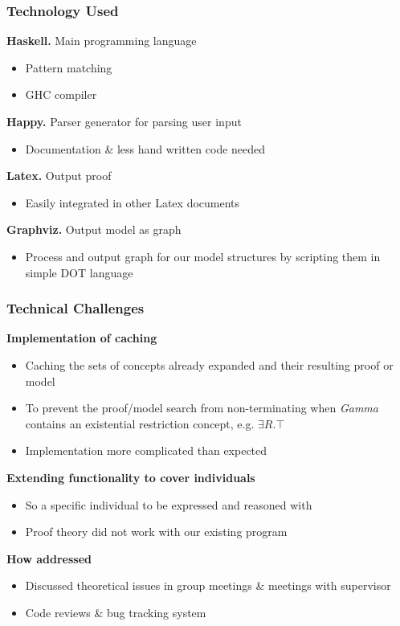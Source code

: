 \begin{frame}
  \frametitle{Technology Used}
\textbf{Haskell.} Main programming language
\begin{itemize}
\item Pattern matching
\item GHC compiler
\end{itemize}
\smallskip
\textbf{Happy.} Parser generator for parsing user input
\begin{itemize}
\item Documentation \& less hand written code needed
\end{itemize}
\smallskip
\textbf{Latex.} Output proof
\begin{itemize}
\item Easily integrated in other Latex documents
\end{itemize}
\smallskip
\textbf{Graphviz.} Output model as graph
\begin{itemize}
\item Process and output graph for our model structures by scripting them in simple DOT language
\end{itemize}
 \end{frame}

\begin{frame}
  \frametitle{Technical Challenges}
\textbf{Implementation of caching}
\begin{itemize}
\item Caching the sets of concepts already expanded and their resulting proof or model
\item To prevent the proof/model search from non-terminating when \textit{Gamma} contains an existential restriction concept, e.g. $\exists R . \top$
\item Implementation more complicated than expected
\end{itemize}

\textbf{Extending functionality to cover individuals}
\begin{itemize}
\item So a specific individual to be expressed and reasoned with
\item Proof theory did not work with our existing program
\end{itemize}

\textbf{How addressed}
\begin{itemize}
\item Discussed theoretical issues in group meetings \& meetings with supervisor
\item Code reviews \& bug tracking system
\end{itemize}
 \end{frame}

